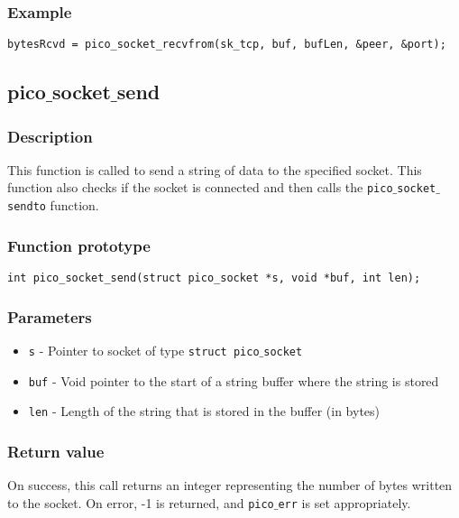 \subsubsection*{Example}
\begin{verbatim}
bytesRcvd = pico_socket_recvfrom(sk_tcp, buf, bufLen, &peer, &port);
\end{verbatim}


\subsection{pico$\_$socket$\_$send}

\subsubsection*{Description}
This function is called to send a string of data to the specified socket.
This function also checks if the socket is connected and then calls the
\texttt{pico$\_$socket$\_$sendto} function.

\subsubsection*{Function prototype}
\begin{verbatim}
int pico_socket_send(struct pico_socket *s, void *buf, int len);
\end{verbatim}


\subsubsection*{Parameters}
\begin{itemize}[noitemsep]
\item \texttt{s} - Pointer to socket of type \texttt{struct pico$\_$socket}
\item \texttt{buf} - Void pointer to the start of a string buffer where the string is stored
\item \texttt{len} - Length of the string that is stored in the buffer (in bytes)
\end{itemize}

\subsubsection*{Return value}
On success, this call returns an integer representing the number of bytes written to
the socket. On error, -1 is returned, and \texttt{pico$\_$err} is set appropriately.

